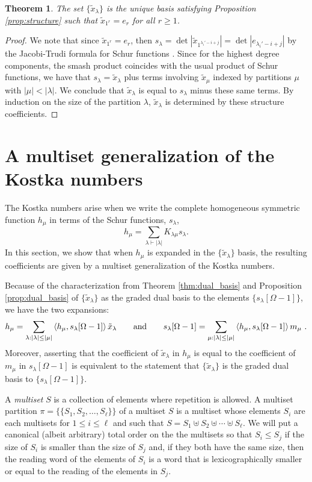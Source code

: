 \documentclass{amsart}
\newtheorem{theorem}[lemma]{Theorem}
\theoremstyle{definition}
\newcommand{\xt}{\tilde x}
\newcommand{\lcr}{\{\!\!\{}
\newcommand{\rcr}{\}\!\!\}}
\begin{document}
\begin{theorem}\label{theorem:structure_characterization}
The set $\{ \xt_\lambda \}$ is the unique basis satisfying Proposition \ref{prop:structure}
such that $\xt_{1^r} = e_r$ for all $r \geq 1$.
\end{theorem}

\begin{proof}  We note that since $\xt_{1^r} = e_r$,
then $s_\lambda = \det | \xt_{1^{\lambda_i' -i+ j}} |= \det | e_{{\lambda_i'-i + j}} |$
by the Jacobi-Trudi formula for Schur functions \cite[Equation (3.5)]{Macdonald}.
Since for the highest degree components, the smash product coincides with the usual
product of Schur functions,
we have that $s_\lambda = \xt_\lambda$ plus terms involving $\xt_\mu$ indexed by partitions
$\mu$ with $|\mu|<|\lambda|$.  We conclude that $\xt_\lambda$ is equal to
$s_\lambda$ minus these same terms. By induction on the size of the
partition $\lambda$, $\xt_\lambda$ is determined by these structure coefficients.
\end{proof}

\section{A multiset generalization of the Kostka numbers}
\label{section:multiset}
The Kostka numbers arise when we write the complete homogeneous symmetric function
$h_\mu$ in terms of the Schur functions, $s_\lambda$,
\[
h_\mu=\sum_{\lambda \vdash |\lambda|}K_{\lambda\mu}s_\lambda.
\]
In this section, we show that when $h_\mu$ is expanded in the
$\{\xt_\lambda\}$ basis, the resulting coefficients are given by a multiset
generalization of the Kostka numbers.

Because of the characterization from
Theorem \ref{thm:dual_basis} and Proposition \ref{prop:dual_basis}
of $\{ \xt_\lambda \}$ as the graded dual basis to the elements
$\{ s_\lambda[\Omega-1] \}$, we have the two expansions:
\[
h_\mu = \sum_{\lambda : |\lambda| \leq |\mu|} \left< h_\mu, s_\lambda[\Omega-1]\right> \xt_\lambda
\qquad\hbox{and}\qquad
s_\lambda[\Omega-1] = \sum_{\mu : |\lambda| \leq |\mu|} \left< h_\mu, s_\lambda[\Omega-1]\right> m_\mu~.
\]
Moreover, asserting that the coefficient of $\xt_\lambda$ in $h_\mu$ is equal
to the coefficient of $m_\mu$ in $s_\lambda[\Omega-1]$ is equivalent to
the statement that $\{ \xt_\lambda \}$ is the graded dual basis
to $\{ s_\lambda[\Omega-1] \}$.

A {\it multiset} $S$ is a collection of elements where repetition is allowed.
A multiset partition $\pi = \lcr S_1,S_2,\ldots,S_\ell\rcr$ of a multiset $S$
is a multiset whose elements $S_i$ are each multisets for $1 \leq i \leq \ell$
and such that $S = S_1 \uplus S_2 \uplus \cdots \uplus S_\ell$.
We will put a canonical (albeit arbitrary) total order on the the multisets
so that $S_i \leqslant S_j$ if the size of $S_i$ is smaller than the size of $S_j$
and, if they both have the same size, then the reading word of the elements of $S_i$ is a word
that is lexicographically smaller or equal to the reading of the elements in $S_j$.
\end{document}

